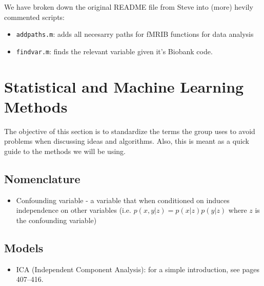 \documentclass{article}
\begin{document}
We have broken down the original README file from Steve into (more) hevily commented scripts:
\begin{itemize}
\item {\tt addpaths.m}: adds all necesarry paths for fMRIB functions for data analysis
  \item {\tt findvar.m}: finds the relevant variable given it's Biobank code.
\end{itemize}


\section{Statistical and Machine Learning Methods\label{sec:methods}}

The objective of this section is to standardize the terms the group uses to avoid problems when discussing ideas and algorithms. Also, this is meant as a quick guide to the methods we will be using.

\subsection{Nomenclature\label{sec:method-nomen}}
\begin{itemize}
\item Confounding variable - a variable that when conditioned on induces independence on other variables (i.e. $p(x,y|z) = p(x|z)p(y|z)$ where $z$ is the confounding variable)
\end{itemize}


\subsection{Models\label{models}}
\begin{itemize}
\item ICA (Independent Component Analysis): for a simple introduction, see \cite{Murphy2012} pages 407--416.
\end{itemize}



\end{document}

